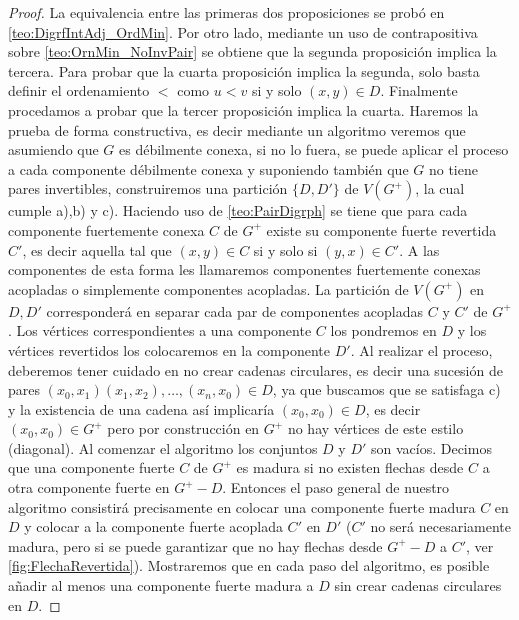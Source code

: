 \begin{teorema}
\begin{proof}
    La equivalencia entre las primeras dos proposiciones se probó en \cref{teo:DigrfIntAdj_OrdMin}.
    Por otro lado, mediante un uso de contrapositiva sobre \cref{teo:OrnMin_NoInvPair} se obtiene que la segunda proposición implica la tercera. 
    {\color{malva}Para probar que la cuarta proposición implica la segunda, solo basta definir el ordenamiento $<$ como $u<v$ si y solo $(x,y) \in D$. }
    Finalmente procedamos a probar que la tercer proposición implica la cuarta. Haremos la prueba de forma constructiva, es decir mediante un algoritmo veremos que asumiendo que $G$ es débilmente conexa, si no lo fuera, se puede aplicar el proceso a cada componente débilmente conexa y  suponiendo también que $G$ no tiene pares invertibles, construiremos una partición $\{D,D'\}$ de $V(G^+)$, la cual cumple a),b) y c). 
    Haciendo uso de \cref{teo:PairDigrph} se tiene que para cada componente fuertemente conexa $C$ de $G^+$ existe su componente fuerte revertida $C'$, es decir aquella tal que $(x,y)\in C $ si y solo si $(y,x)\in C'$. A las componentes de esta forma les llamaremos componentes fuertemente conexas acopladas o simplemente componentes acopladas.
    La partición de $V(G^+)$ en $D,D'$ corresponderá en separar cada par de componentes acopladas $C$ y $C'$ de $G^+$. Los vértices correspondientes a una componente $C$ los pondremos en $D$ y los vértices revertidos los colocaremos en la componente $D'$. Al realizar el proceso, deberemos tener cuidado en no crear cadenas circulares, es decir una sucesión de pares $(x_0,x_1)(x_1,x_2),\dots, (x_n,x_0)\in D$, ya que buscamos que se satisfaga c) y la existencia de una cadena así implicaría $(x_0,x_0)\in D$, es decir $(x_0,x_0)\in G^+$ pero por construcción en $G^+$ no hay vértices de este estilo (diagonal). 
    Al comenzar el algoritmo los conjuntos $D$ y $D'$ son vacíos. Decimos que una componente fuerte $C$ de $G^+$ es madura si no existen flechas desde $C$ a otra componente fuerte en $G^+ -D$. Entonces el paso general de nuestro algoritmo consistirá precisamente en colocar una componente fuerte madura $C$ en $D$ y colocar a la componente fuerte acoplada $C' $ en $D'$ ($C'$ no será necesariamente madura, pero si se puede garantizar que no hay flechas desde $G^+ -D$ a $C'$, ver \cref{fig:FlechaRevertida}). 
    Mostraremos que en cada paso del algoritmo, es posible añadir al menos una componente fuerte madura a $D$ sin crear cadenas circulares en $D$.


    
 \end{proof}
        
        
        
        
 \end{teorema}